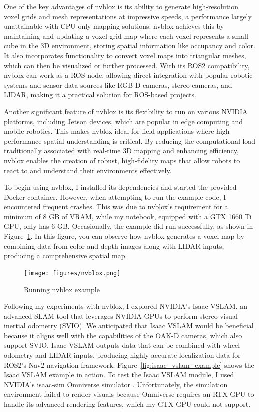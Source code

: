 One of the key advantages of nvblox is its ability to generate high-resolution voxel grids and mesh representations at impressive speeds, a performance largely unattainable with CPU-only mapping solutions. nvblox achieves this by maintaining and updating a voxel grid map where each voxel represents a small cube in the 3D environment, storing spatial information like occupancy and color. It also incorporates functionality to convert voxel maps into triangular meshes, which can then be visualized or further processed. With its ROS2 compatibility, nvblox can work as a ROS node, allowing direct integration with popular robotic systems and sensor data sources like RGB-D cameras, stereo cameras, and LIDAR, making it a practical solution for ROS-based projects.

Another significant feature of nvblox is its flexibility to run on various NVIDIA platforms, including Jetson devices, which are popular in edge computing and mobile robotics. This makes nvblox ideal for field applications where high-performance spatial understanding is critical. By reducing the computational load traditionally associated with real-time 3D mapping and enhancing efficiency, nvblox enables the creation of robust, high-fidelity maps that allow robots to react to and understand their environments effectively.

To begin using nvblox, I installed its dependencies and started the provided Docker container. However, when attempting to run the example code, I encountered frequent crashes. This was due to nvblox’s requirement for a minimum of 8 GB of VRAM, while my notebook, equipped with a GTX 1660 Ti GPU, only has 6 GB. Occasionally, the example did run successfully, as shown in Figure~\ref{fig:nvblox_example}. In this figure, you can observe how nvblox generates a voxel map by combining data from color and depth images along with LIDAR inputs, producing a comprehensive spatial map.

\begin{figure}[htbp]
	\centering
	\texttt{[image: figures/nvblox.png]}
	\caption{Running nvblox example}
	\label{fig:nvblox_example}
\end{figure}

Following my experiments with nvblox, I explored NVIDIA's Isaac VSLAM, an advanced SLAM tool that leverages NVIDIA GPUs to perform stereo visual inertial odometry (SVIO). We anticipated that Isaac VSLAM would be beneficial because it aligns well with the capabilities of the OAK-D cameras, which also support SVIO. Isaac VSLAM outputs data that can be combined with wheel odometry and LIDAR inputs, producing highly accurate localization data for ROS2's Nav2 navigation framework. Figure~\ref{fig:isaac_vslam_example} shows the Isaac VSLAM example in action. To test the Isaac VSLAM module, I used NVIDIA's isaac-sim Omniverse simulator \cite{isaac_sim_docs}. Unfortunately, the simulation environment failed to render visuals because Omniverse requires an RTX GPU to handle its advanced rendering features, which my GTX GPU could not support.

